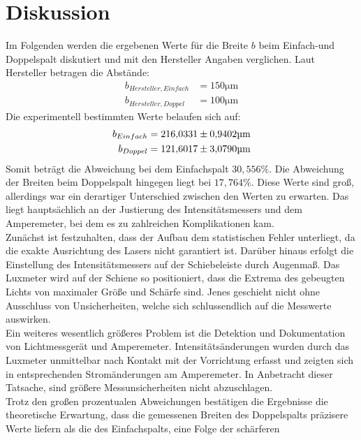 \section{Diskussion}
\label{sec:Diskussion}

Im Folgenden werden die ergebenen Werte für die Breite $b$ beim Einfach-und 
Doppelspalt diskutiert und mit den Hersteller Angaben verglichen. Laut Hersteller
betragen die Abstände:
\begin{align*}
    b_{Hersteller,Einfach} &= 150 \unit{\micro\meter} \\
    b_{Hersteller,Doppel}  &= 100 \unit{\micro\meter}
\end{align*}
\noindent Die experimentell bestimmten Werte belaufen sich auf:
\begin{align*}
    b_{Einfach} &= \num{216.0331+-0.9402} \unit{\micro\meter} \\
    b_{Doppel}  &= \num{121.6017+-3.0790} \unit{\micro\meter}
\end{align*}
\noindent Somit beträgt die Abweichung bei dem Einfachspalt $30,556 \%$. Die 
Abweichung der Breiten beim Doppelspalt hingegen liegt bei $17,764 \%$. Diese 
Werte sind groß, allerdings war ein derartiger Unterschied zwischen den Werten 
zu erwarten. Das liegt hauptsächlich an der Justierung des Intensitätsmessers 
und dem Amperemeter, bei dem es zu zahlreichen Komplikationen kam.
\\
\noindent Zunächst ist
festzuhalten, dass der Aufbau dem statistischen Fehler unterliegt, da die
exakte Ausrichtung des Lasers nicht garantiert ist. Darüber hinaus erfolgt 
die Einstellung des Intensitätsmessers auf der Schiebeleiste durch Augenmaß. 
Das Luxmeter wird auf der Schiene so positioniert, dass die Extrema des 
gebeugten Lichts von maximaler Größe und Schärfe sind. Jenes geschieht nicht 
ohne Ausschluss von Unsicherheiten, welche sich schlussendlich auf die 
Messwerte auswirken.
\\
\noindent Ein weiteres wesentlich größeres Problem ist die Detektion und 
Dokumentation von Lichtmessgerät und Amperemeter. Intensitätsänderungen
wurden durch das Luxmeter unmittelbar nach Kontakt mit der Vorrichtung
erfasst und zeigten sich in entsprechenden Stromänderungen am Amperemeter.
In Anbetracht dieser Tatsache, sind größere Messunsicherheiten nicht abzuschlagen.
\\
\noindent Trotz den großen prozentualen Abweichungen bestätigen die Ergebnisse
die theoretische Erwartung, dass die gemessenen Breiten des Doppelspalts präzisere
Werte liefern als die des Einfachspalts, eine Folge der schärferen 
